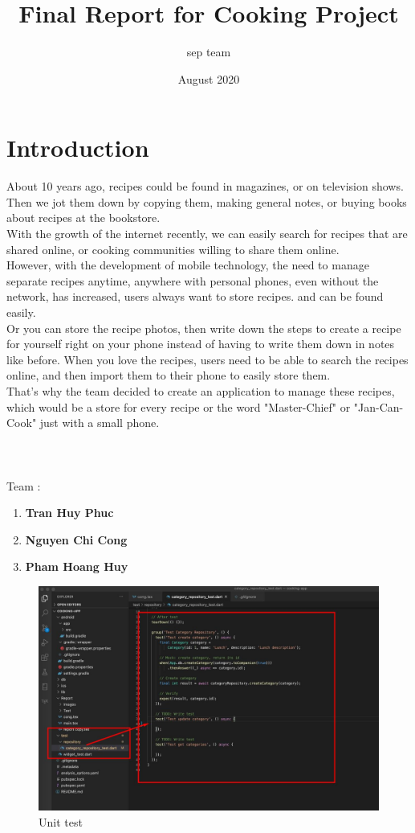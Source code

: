 \documentclass{article}
\title{Final Report for Cooking Project}
\author{sep team }
\date{August 2020}
\begin{document}
\maketitle

\section{Introduction}
About 10 years ago, recipes could be found in magazines, or on television shows.
Then we jot them down by copying them, making general notes, or buying books about recipes at the bookstore.\\
With the growth of the internet recently, we can easily search for recipes that are shared online, or cooking communities willing to share them online.\\
However, with the development of mobile technology, the need to manage separate recipes anytime, anywhere with personal phones, even without the network, has increased, users always want to store recipes. and can be found easily.\\
Or you can store the recipe photos, then write down the steps to create a recipe for yourself right on your phone instead of having to write them down in notes like before.
When you love the recipes, users need to be able to search the recipes online, and then import them to their phone to easily store them. \\
That's why the team decided to create an application to manage these recipes, which would be a store for every recipe or the word "Master-Chief" or "Jan-Can-Cook" just with a small phone. \\ \\ \\ \\
Team :
    \begin{enumerate}
        \item \textbf{Tran Huy Phuc} 
        \item \textbf{Nguyen Chi Cong }
        \item \textbf{Pham Hoang Huy}
    \end{enumerate}


\begin{figure}
\centering
\includegraphics[scale=0.3]{Images/Unit-Test.jpg}
\caption{Unit test}
\label{fig:cookingbook}
\end{figure}
\end{document}
